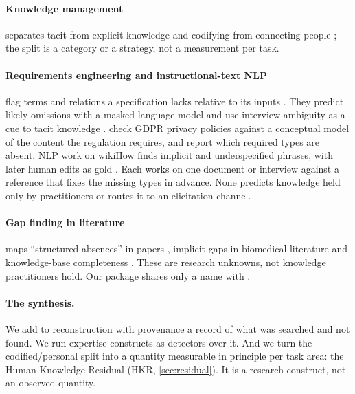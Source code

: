 \paragraph{Knowledge management} \evlit{} separates tacit from explicit knowledge
\parencite{nonaka1994dynamic} and codifying from connecting people \parencite{hansen1999whats};
\evint{} the split is a category or a strategy, not a measurement per task.

\paragraph{Requirements engineering and instructional-text NLP} \evlit{} flag terms and relations a
specification lacks relative to its inputs \parencite{ferrari2014measuring}. They predict likely
omissions with a masked language model \parencite{luitel2024improving} and use interview ambiguity as
a cue to tacit knowledge \parencite{ferrari2016ambiguity}. \textcite{torre2020ai} check GDPR privacy policies
against a conceptual model of the content the regulation requires, and report which required types
are absent. NLP work on wikiHow finds implicit and underspecified phrases, with later human edits as
gold \parencite{anthonio2020wikihowtoimprove,anthonio2022clarifying}. \evint{} Each works on one
document or interview against a reference that fixes the missing types in advance. None predicts
knowledge held only by practitioners or routes it to an elicitation channel.

\paragraph{Gap finding in literature} \evlit{} maps \enquote{structured absences} in papers
\parencite{ono2026mapping}, implicit gaps in biomedical literature \parencite{salem2025gapmap} and
knowledge-base completeness \parencite{razniewski2024completeness}. These are research unknowns, not
knowledge practitioners hold. Our  package shares only a name with
\textcite{salem2025gapmap}.

\paragraph{The synthesis.} \evint{} We add to reconstruction with provenance a record of what was
searched and not found. We run expertise constructs as detectors over it. And we turn the
codified/personal split into a quantity measurable in principle per task area: the Human Knowledge
Residual (HKR, \cref{sec:residual}). It is a research construct, not an observed quantity.


